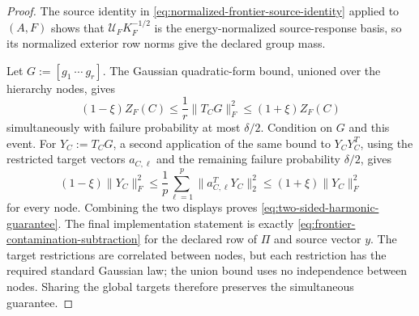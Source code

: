 \begin{proof}
The source identity in
\cref{eq:normalized-frontier-source-identity} applied to $(A,F)$ shows that
$\mathcal U_FK_F^{-1/2}$ is the energy-normalized source-response basis, so
its normalized exterior row norms give the declared group mass.

Let $G:=[g_1\ \cdots\ g_r]$.  The Gaussian quadratic-form bound, unioned over
the hierarchy nodes, gives
\begin{equation*}
 (1-\xi)Z_F(C)
 \leq\frac1r\|T_CG\|_F^2
 \leq(1+\xi)Z_F(C)
\end{equation*}
simultaneously with failure probability at most $\delta/2$.  Condition on
$G$ and this event.  For $Y_C:=T_CG$, a second application of the same bound
to $Y_CY_C^T$, using the restricted target vectors $a_{C,\ell}$ and the remaining
failure probability $\delta/2$, gives
\begin{equation*}
 (1-\xi)\|Y_C\|_F^2
 \leq\frac1p\sum_{\ell=1}^p\|a_{C,\ell}^TY_C\|_2^2
 \leq(1+\xi)\|Y_C\|_F^2
\end{equation*}
for every node.  Combining the two displays proves
\cref{eq:two-sided-harmonic-guarantee}.  The final implementation statement
is exactly \cref{eq:frontier-contamination-subtraction} for the declared row
of $\Pi$ and source vector $y$.  The target restrictions are correlated
between nodes, but each restriction has the required standard Gaussian law;
the union bound uses no independence between nodes.  Sharing the global
targets therefore preserves the simultaneous guarantee.
\end{proof}

